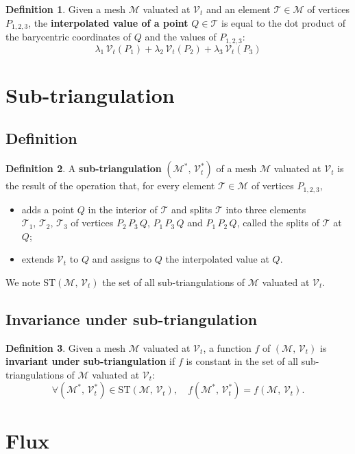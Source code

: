 \documentclass{article}
\theoremstyle{definition}
\newtheorem{defn}{Definition}
\newcommand{\MM}{\mathcal{M}}
\newcommand{\VV}{\mathcal{V}}
\newcommand{\TT}{\mathcal{T}}
\newcommand{\ST}{\mathrm{ST}}
\begin{document}
\begin{defn}
Given a mesh $\MM$ valuated at $\VV_t$ and an element $\TT\in\MM$ of vertices $P_{1,2,3}$, the \textbf{interpolated value of a point} $Q\in\TT$ is equal to the dot product of the barycentric coordinates of $Q$ and the values of $P_{1,2,3}$:
\[\lambda_1\,\VV_t(P_1) + \lambda_2\,\VV_t(P_2) + \lambda_3\,\VV_t(P_3)\]
\end{defn}


\section{Sub-triangulation}
\subsection{Definition}
\begin{defn}
A \textbf{sub-triangulation} $(\MM^*,\,\VV_t^*)$ of a mesh $\MM$ valuated at $\VV_t$ is the result of the operation that, for every element $\TT\in\MM$ of vertices $P_{1,2,3}$,
\begin{itemize}
\item adds a point $Q$ in the interior of $\TT$ and splits $\TT$ into three elements $\TT_1,\,\TT_2,\,\TT_3$ of vertices $P_2\,P_3\,Q$, $P_1\,P_3\,Q$ and $P_1\,P_2\,Q$, called the splits of $\TT$ at $Q$;
\item extends $\VV_t$ to $Q$ and assigns to $Q$ the interpolated value at $Q$.
\end{itemize}
We note $\ST(\MM,\,\VV_t)$ the set of all sub-triangulations of $\MM$ valuated at $\VV_t$.
\end{defn}

\subsection{Invariance under sub-triangulation}
\begin{defn}
Given a mesh $\MM$ valuated at $\VV_t$, a function $f$ of $(\MM,\,\VV_t)$ is \textbf{invariant under sub-triangulation} if $f$ is constant in the set of all sub-triangulations of $\MM$ valuated at $\VV_t$:
\[\forall (\MM^*,\,\VV_t^*)\in\ST(\MM,\,\VV_t),\quad f(\MM^*,\,\VV_t^*) = f(\MM,\,\VV_t).\]
\end{defn}


\section{Flux}
\end{document}

